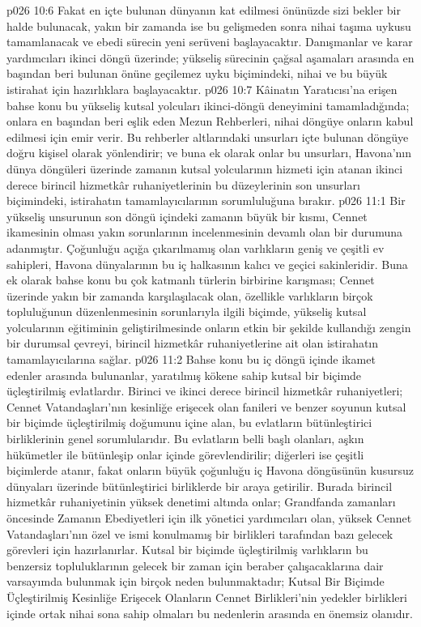 \vs p026 10:6 Fakat en içte bulunan dünyanın kat edilmesi önünüzde sizi bekler bir halde bulunacak, yakın bir zamanda ise bu gelişmeden sonra nihai taşıma uykusu tamamlanacak ve ebedi sürecin yeni serüveni başlayacaktır. Danışmanlar ve karar yardımcıları ikinci döngü üzerinde; yükseliş sürecinin çağsal aşamaları arasında en başından beri bulunan önüne geçilemez uyku biçimindeki, nihai ve bu büyük istirahat için hazırlıklara başlayacaktır.
\vs p026 10:7 Kâinatın Yaratıcısı’na erişen bahse konu bu yükseliş kutsal yolcuları ikinci\hyp{}döngü deneyimini tamamladığında; onlara en başından beri eşlik eden Mezun Rehberleri, nihai döngüye onların kabul edilmesi için emir verir. Bu rehberler altlarındaki unsurları içte bulunan döngüye doğru kişisel olarak yönlendirir; ve buna ek olarak onlar bu unsurları, Havona’nın dünya döngüleri üzerinde zamanın kutsal yolcularının hizmeti için atanan ikinci derece birincil hizmetkâr ruhaniyetlerinin bu düzeylerinin son unsurları biçimindeki, istirahatın tamamlayıcılarının sorumluluğuna bırakır.
\vs p026 11:1 Bir yükseliş unsurunun son döngü içindeki zamanın büyük bir kısmı, Cennet ikamesinin olması yakın sorunlarının incelenmesinin devamlı olan bir durumuna adanmıştır. Çoğunluğu açığa çıkarılmamış olan varlıkların geniş ve çeşitli ev sahipleri, Havona dünyalarının bu iç halkasının kalıcı ve geçici sakinleridir. Buna ek olarak bahse konu bu çok katmanlı türlerin birbirine karışması; Cennet üzerinde yakın bir zamanda karşılaşılacak olan, özellikle varlıkların birçok topluluğunun düzenlenmesinin sorunlarıyla ilgili biçimde, yükseliş kutsal yolcularının eğitiminin geliştirilmesinde onların etkin bir şekilde kullandığı zengin bir durumsal çevreyi, birincil hizmetkâr ruhaniyetlerine ait olan istirahatın tamamlayıcılarına sağlar.
\vs p026 11:2 Bahse konu bu iç döngü içinde ikamet edenler arasında bulunanlar, yaratılmış kökene sahip kutsal bir biçimde üçleştirilmiş evlatlardır. Birinci ve ikinci derece birincil hizmetkâr ruhaniyetleri; Cennet Vatandaşları’nın kesinliğe erişecek olan fanileri ve benzer soyunun kutsal bir biçimde üçleştirilmiş doğumunu içine alan, bu evlatların bütünleştirici birliklerinin genel sorumlularıdır. Bu evlatların belli başlı olanları, aşkın hükümetler ile bütünleşip onlar içinde görevlendirilir; diğerleri ise çeşitli biçimlerde atanır, fakat onların büyük çoğunluğu iç Havona döngüsünün kusursuz dünyaları üzerinde bütünleştirici birliklerde bir araya getirilir. Burada birincil hizmetkâr ruhaniyetinin yüksek denetimi altında onlar; Grandfanda zamanları öncesinde Zamanın Ebediyetleri için ilk yönetici yardımcıları olan, yüksek Cennet Vatandaşları’nın özel ve ismi konulmamış bir birlikleri tarafından bazı gelecek görevleri için hazırlanırlar. Kutsal bir biçimde üçleştirilmiş varlıkların bu benzersiz topluluklarının gelecek bir zaman için beraber çalışacaklarına dair varsayımda bulunmak için birçok neden bulunmaktadır; Kutsal Bir Biçimde Üçleştirilmiş Kesinliğe Erişecek Olanların Cennet Birlikleri’nin yedekler birlikleri içinde ortak nihai sona sahip olmaları bu nedenlerin arasında en önemsiz olanıdır.
